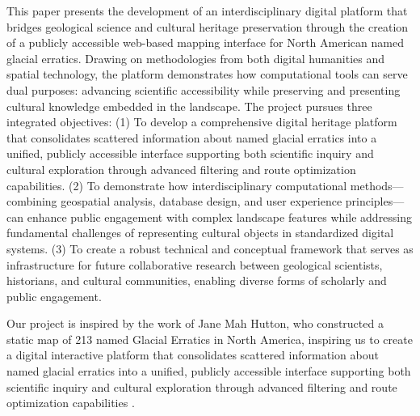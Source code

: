 This paper presents the development of an interdisciplinary digital platform that bridges geological science and cultural heritage preservation through the creation of a publicly accessible web-based mapping interface for North American named glacial erratics. Drawing on methodologies from both digital humanities and spatial technology, the platform demonstrates how computational tools can serve dual purposes: advancing scientific accessibility while preserving and presenting cultural knowledge embedded in the landscape. The project pursues three integrated objectives: (1) To develop a comprehensive digital heritage platform that consolidates scattered information about named glacial erratics into a unified, publicly accessible interface supporting both scientific inquiry and cultural exploration through advanced filtering and route optimization capabilities. (2) To demonstrate how interdisciplinary computational methods—combining geospatial analysis, database design, and user experience principles—can enhance public engagement with complex landscape features while addressing fundamental challenges of representing cultural objects in standardized digital systems. (3) To create a robust technical and conceptual framework that serves as infrastructure for future collaborative research between geological scientists, historians, and cultural communities, enabling diverse forms of scholarly and public engagement.

Our project is inspired by the work of Jane Mah Hutton, who constructed a static map of 213 named Glacial Erratics in North America, inspiring us to create a digital interactive platform that consolidates scattered information about named glacial erratics into a unified, publicly accessible interface supporting both scientific inquiry and cultural exploration through advanced filtering and route optimization capabilities \cite{making_the_geologic_now}.

